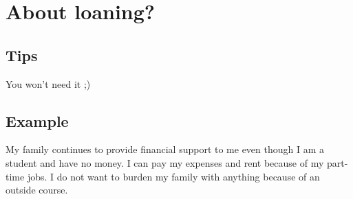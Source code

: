 \chapter{About loaning?}

\section{Tips}
You won't need it ;)

\section{Example}
My family continues to provide financial support to me even though I am a student and have no money. I can pay my expenses and rent because of my part-time jobs. I do not want to burden my family with anything because of an outside course. 